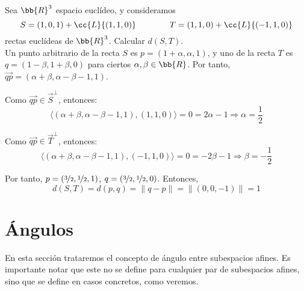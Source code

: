 \begin{ejemplo}
    Sea $\bb{R}^3$ espacio euclídeo, y consideramos $$S= (1,0,1)+\cc{L}\{(1,1, 0)\}\qquad \qquad T= (1,1,0)+\cc{L}\{(-1,1,0)\}$$
    rectas euclídeas de $\bb{R}^3$. Calcular $d(S,T)$.\\

    Un punto arbitrario de la recta $S$ es $p=(1+\alpha, \alpha, 1)$, y uno de la recta $T$ es $q=(1-\beta, 1+\beta, 0)$ para ciertos $\alpha,\beta\in \bb{R}$. Por tanto, $\vec{qp}=(\alpha + \beta, \alpha-\beta-1, 1)$.

    Como $\vec{qp}\in \vec{S}^\perp$, entonces:
    \begin{equation*}
        \langle (\alpha+\beta, \alpha-\beta-1, 1), (1,1,0)\rangle = 0 = 2\alpha-1 \Longrightarrow \alpha = \frac{1}{2}
    \end{equation*}
    
    Como $\vec{qp}\in \vec{T}^\perp$, entonces:
    \begin{equation*}
        \langle (\alpha+\beta, \alpha-\beta-1, 1), (-1,1,0)\rangle = 0 = -2\beta-1 \Longrightarrow \beta = -\frac{1}{2}
    \end{equation*}

    Por tanto, $p=(\nicefrac{3}{2},\nicefrac{1}{2}, 1)$, $q=(\nicefrac{3}{2}, \nicefrac{1}{2}, 0)$. Entonces,
    \begin{equation*}
        d(S,T)=d(p,q) = \|q-p\| = \|(0,0,-1)\| = 1
    \end{equation*}
\end{ejemplo}

\section{Ángulos}
En esta sección trataremos el concepto de ángulo entre subespacios afines. Es importante notar que
este no se define para cualquier par de subespacios afines, sino que se define en casos concretos, como veremos.

